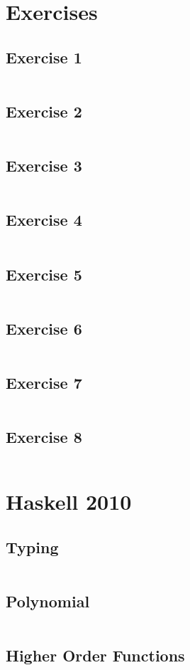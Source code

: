 \documentclass[a4paper,9pt]{article}
\newcommand{\hsfile}[1]{\inputminted[breaklines]{haskell}{../haskell/#1.hs}}
\begin{document}
\section{Exercises}
\subsection{Exercise 1}
\hsfile{ex01/ex01}
\subsection{Exercise 2}
\hsfile{ex02/ex02}
\subsection{Exercise 3}
\hsfile{ex03/ex03}
\subsection{Exercise 4}
\hsfile{ex04/ex04}
\subsection{Exercise 5}
\hsfile{ex05/ex05}
\subsection{Exercise 6}
\hsfile{ex06/ex06}
\subsection{Exercise 7}
\hsfile{ex07/ex07}
\subsection{Exercise 8}
\hsfile{ex08/ex08}
\section{Haskell 2010}
\subsection{Typing}
\hsfile{exam2010/problem_1}
\subsection{Polynomial}
\hsfile{exam2010/problem_2}
\subsection{Higher Order Functions}
\hsfile{exam2010/problem_3}
\end{document}
